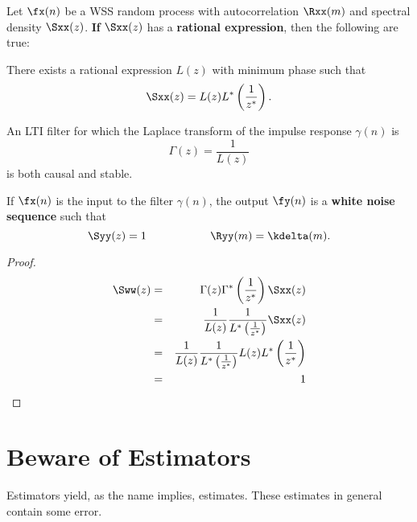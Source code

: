 \begin{theorem}
\label{thm:d-innovations}
Let $\fx(n)$ be a WSS random process with autocorrelation $\Rxx(m)$
and spectral density $\Sxx(z)$.
\textbf{If} $\Sxx(z)$ has a \textbf{rational expression},
then the following are true:

\begin{enume}
   \item There exists a rational expression $L(z)$ with minimum phase
         such that
         \[ \Sxx(z) = L(z)L^\ast\left(\frac{1}{z^\ast}\right). \]
   \item An LTI filter for which the Laplace transform of
         the impulse response $\gamma(n)$ is
         \[ \Gamma(z) = \frac{1}{L(z)} \]
         is both causal and stable.
   \item If $\fx(n)$ is the input to the filter $\gamma(n)$,
         the output $\fy(n)$ is a \textbf{white noise sequence} such that
         \[ \Syy(z)=1 \hspace{2cm} \Ryy(m)=\kdelta(m).\]
\end{enume}
\end{theorem}


\begin{proof}
\begin{eqnarray*}
   \Sww(z)
     &=& \Gamma(z)\Gamma^\ast\left(\frac{1}{z^\ast}\right) \Sxx(z)
   \\&=& \frac{1}{L(z)} \frac{1}{L^\ast\left(\frac{1}{z^\ast}\right)} \Sxx(z)
   \\&=& \frac{1}{L(z)} \frac{1}{L^\ast\left(\frac{1}{z^\ast}\right)}
         L(z) L^\ast\left(\frac{1}{z^\ast}\right)
   \\&=& 1
\end{eqnarray*}
\end{proof}



\section{Beware of Estimators}
Estimators yield, as the name implies, estimates.
These estimates in general contain some error.

